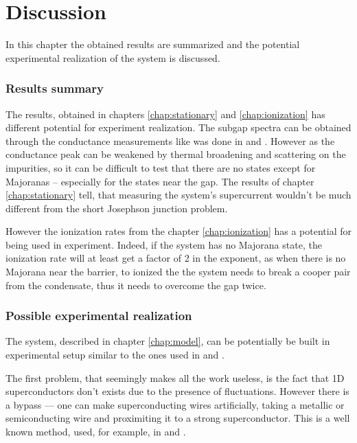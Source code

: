 \chapter{Discussion} 
\label{chap:discssion}
In this chapter the obtained results are summarized and the potential experimental realization of the system is discussed. 
\subsection{Results summary}
The results, obtained in chapters \ref{chap:stationary} and \ref{chap:ionization} has different potential for experiment realization. The subgap spectra can be obtained through the conductance measurements like was done in \cite{majorana_experiment_Kouwenhoven} and \cite{majorana_experiment_Zhang}. However as the conductance peak can be weakened by thermal broadening and scattering on the impurities, so it can be difficult to test that there are no states except for Majoranas -- especially for the states near the gap. The results of chapter \ref{chap:stationary} tell, that measuring the system's supercurrent wouldn't be much different from the short Josephson junction problem.

However the ionization rates from the chapter \ref{chap:ionization} has a potential for being used in experiment. Indeed, if the system has no Majorana state, the ionization rate will at least get a factor of 2 in the exponent, as when there is no Majorana near the barrier, to ionized the the system needs to break a cooper pair from the condensate, thus it needs to overcome the gap twice.

\subsection{Possible experimental realization}

The system, described in chapter \ref{chap:model}, can be potentially be built in experimental setup similar to the ones used in \cite{majorana_experiment_Kouwenhoven} and \cite{majorana_experiment_Zhang}. 

The first problem, that seemingly makes all the work useless, is the fact that 1D superconductors don't exists due to the presence of fluctuations. However there is a bypass --- one can make superconducting wires artificially, taking a metallic or semiconducting wire and proximiting it to a strong superconductor. This is a well known method, used, for example, in \cite{majorana_experiment_Kouwenhoven} and \cite{majorana_experiment_Zhang}. 

